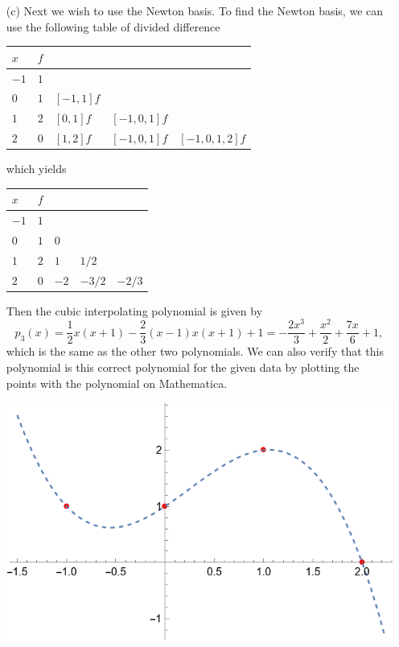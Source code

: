 \documentclass[12pt]{report}
\begin{document}
\begin{solution}
\begin{enumerate}
        
        \item [(c)] Next we wish to use the Newton basis. To find the Newton basis, we can use the following table of divided difference        
        \begin{center}
            \begin{tabular}{lllll}
                $x$&  $f$&  &  &   \\
                \hline
                $-1$&  $1$&  &  &   \\
                $0$&  $1$&  $[-1,1]f$&  &   \\
                $1$&  $2$&  $[0,1]f$& $[-1,0,1]f$ &   \\
                $2$&  $0$&  $[1,2]f$&  $[-1,0,1]f$&  $[-1,0,1,2]f$
            \end{tabular}    
        \end{center}
        which yields
        \begin{center}
            \begin{tabular}{lllll}
                $x$&  $f$&  &  &   \\
                \hline
                $-1$&  $1$&  &  &   \\
                $0$&  $1$&  $0$&  &   \\
                $1$&  $2$&  $1$& $1/2$&   \\
                $2$&  $0$&  $-2$&  $-3/2$&  $-2/3$
            \end{tabular}    
        \end{center}
        Then the cubic interpolating polynomial is given by
        \[ 
            p_3(x) = \frac{1}{2} x (x+1)-\frac{2}{3} (x-1) x (x+1)+1 = -\frac{2 x^3}{3}+\frac{x^2}{2}+\frac{7 x}{6}+1,
        \]
        which is the same as the other two polynomials. We can also verify that this polynomial is this correct polynomial for the given data by plotting the points with the polynomial on Mathematica.
        \begin{center}
            \includegraphics[width=.8\textwidth]{plots/Q2.png}
        \end{center}
    \end{enumerate}
\end{solution}
\end{document}
